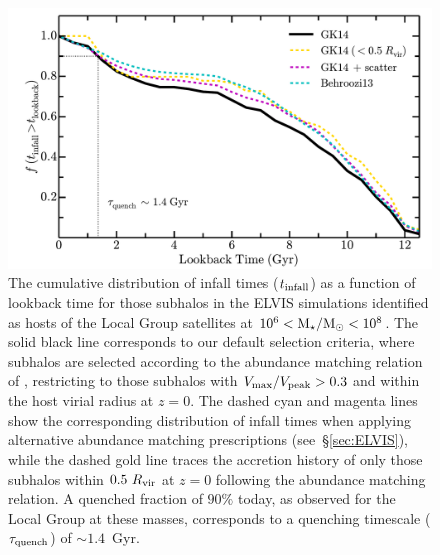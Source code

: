 \begin{figure}
 \centering
 \hspace*{-0.12in}
 \includegraphics[width=6.5in]{ch1_f3.pdf}
 \caption{The cumulative distribution of infall times ($t_{\rm
     infall}$) as a function of lookback time for those subhalos in
   the ELVIS simulations identified as hosts of the Local Group
   satellites at $10^{6} < {\rm M}_{\star}/{\rm M}_{\odot} < 10^{8}$. The solid black
   line corresponds to our default selection criteria, where subhalos
   are selected according to the abundance matching relation of
   \citet{gk14}, restricting to those subhalos with $V_{\rm
     max}/V_{\rm peak} > 0.3$ and within the host virial radius at $z
   = 0$.  The dashed cyan and magenta lines show the corresponding
   distribution of infall times when applying alternative abundance
   matching prescriptions (see~\S\ref{sec:ELVIS}), while the dashed
   gold line traces the accretion history of only those subhalos
   within $0.5~R_{\rm vir}$ at $z = 0$ following the \citet{gk14}
   abundance matching relation. A quenched fraction of $90\%$ today,
   as observed for the Local Group at these masses, corresponds to a
   quenching timescale ($\tau_{\rm quench}$) of $\sim 1.4$~Gyr. }
 \label{fig:tinfall}
\end{figure}





